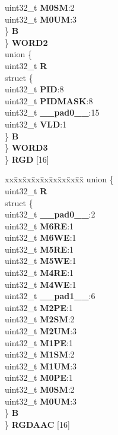 \begin{DoxyCompactItemize}
\begin{tabbing}
\>\>\>uint32\_t {\bfseries M0SM}:2\\
\>\>\>uint32\_t {\bfseries M0UM}:3\\
\>\>\} {\bfseries B}\\
\>\} {\bfseries WORD2}\\
\>union \{\\
\>\>uint32\_t {\bfseries R}\\
\>\>struct \{\\
\>\>\>uint32\_t {\bfseries PID}:8\\
\>\>\>uint32\_t {\bfseries PIDMASK}:8\\
\>\>\>uint32\_t {\bfseries \_\_pad0\_\_}:15\\
\>\>\>uint32\_t {\bfseries VLD}:1\\
\>\>\} {\bfseries B}\\
\>\} {\bfseries WORD3}\\
\} {\bfseries RGD} \mbox{[}16\mbox{]}\\

\end{tabbing}\item 
\mbox{\label{structMPU__tag_aef7caa936042f68b5cbb8692ad191fb2}} 
\begin{tabbing}
xx\=xx\=xx\=xx\=xx\=xx\=xx\=xx\=xx\=\kill
union \{\\
\>uint32\_t {\bfseries R}\\
\>struct \{\\
\>\>uint32\_t {\bfseries \_\_pad0\_\_}:2\\
\>\>uint32\_t {\bfseries M6RE}:1\\
\>\>uint32\_t {\bfseries M6WE}:1\\
\>\>uint32\_t {\bfseries M5RE}:1\\
\>\>uint32\_t {\bfseries M5WE}:1\\
\>\>uint32\_t {\bfseries M4RE}:1\\
\>\>uint32\_t {\bfseries M4WE}:1\\
\>\>uint32\_t {\bfseries \_\_pad1\_\_}:6\\
\>\>uint32\_t {\bfseries M2PE}:1\\
\>\>uint32\_t {\bfseries M2SM}:2\\
\>\>uint32\_t {\bfseries M2UM}:3\\
\>\>uint32\_t {\bfseries M1PE}:1\\
\>\>uint32\_t {\bfseries M1SM}:2\\
\>\>uint32\_t {\bfseries M1UM}:3\\
\>\>uint32\_t {\bfseries M0PE}:1\\
\>\>uint32\_t {\bfseries M0SM}:2\\
\>\>uint32\_t {\bfseries M0UM}:3\\
\>\} {\bfseries B}\\
\} {\bfseries RGDAAC} \mbox{[}16\mbox{]}\\


\end{tabbing}
\end{DoxyCompactItemize}

